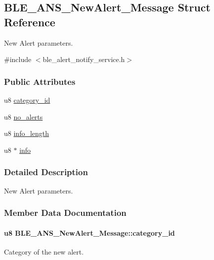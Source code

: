 \hypertarget{struct_b_l_e___a_n_s___new_alert___message}{}\subsection{B\+L\+E\+\_\+\+A\+N\+S\+\_\+\+New\+Alert\+\_\+\+Message Struct Reference}
\label{struct_b_l_e___a_n_s___new_alert___message}


New Alert parameters.  




{\ttfamily \#include $<$ble\+\_\+alert\+\_\+notify\+\_\+service.\+h$>$}

\subsubsection*{Public Attributes}
\begin{DoxyCompactItemize}
\item 
u8 \hyperlink{struct_b_l_e___a_n_s___new_alert___message_a9c5c3413b92a4d9d1f326b8f81b9adb1}{category\+\_\+id}
\item 
u8 \hyperlink{struct_b_l_e___a_n_s___new_alert___message_a74bc11d3f3cc372333cf4afc7a5c0974}{no\+\_\+alerts}
\item 
u8 \hyperlink{struct_b_l_e___a_n_s___new_alert___message_a32de18fe414f44ece955b36a01af2a2d}{info\+\_\+length}
\item 
u8 $\ast$ \hyperlink{struct_b_l_e___a_n_s___new_alert___message_ad77920092d97c0b966543e508f184321}{info}
\end{DoxyCompactItemize}


\subsubsection{Detailed Description}
New Alert parameters. 

\subsubsection{Member Data Documentation}
\paragraph[{\texorpdfstring{category\+\_\+id}{category_id}}]{\setlength{\rightskip}{0pt plus 5cm}u8 B\+L\+E\+\_\+\+A\+N\+S\+\_\+\+New\+Alert\+\_\+\+Message\+::category\+\_\+id}\hypertarget{struct_b_l_e___a_n_s___new_alert___message_a9c5c3413b92a4d9d1f326b8f81b9adb1}{}\label{struct_b_l_e___a_n_s___new_alert___message_a9c5c3413b92a4d9d1f326b8f81b9adb1}
Category of the new alert. 
